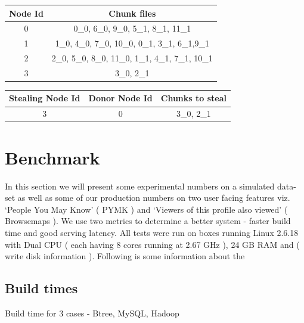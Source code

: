 \documentclass[10pt,twocolumn,preprint,natbib,authoryear]{sigplanconf}
\begin{document}
\begin{center}
    \begin{tabular}{ | c | c | }
    \hline
    Node Id & Chunk files \\ \hline
    0 &  	0\_0, 6\_0, 9\_0,      			5\_1, 8\_1, 11\_1 			\\
   	1 &   	1\_0, 4\_0, 7\_0, 10\_0,      	0\_1, 3\_1, 6\_1,9\_1  		\\
   	2 &    	2\_0, 5\_0, 8\_0, 11\_0,    	1\_1, 4\_1, 7\_1, 10\_1		\\
   	3 &   	3\_0,                         	2\_1 						\\
\hline
    \end{tabular}
\end{center}

\begin{center}
    \begin{tabular}{ | c | c | c | }
    \hline
    Stealing Node Id & Donor Node Id & Chunks to steal \\ \hline
    3 &  0 & 3\_0, 2\_1	\\
\hline
    \end{tabular}
\end{center}



\section{Benchmark}
\label{sec:benchmark}

In this section we will present some experimental numbers on a simulated data-set as well as some of our production numbers on two user facing features viz. `People You May Know' ( PYMK ) and `Viewers of this profile also viewed' ( Browsemaps ). We use two metrics to determine a better system - faster build time and good serving latency. All tests were run on boxes running Linux 2.6.18 with Dual CPU ( each having 8 cores running at 2.67 GHz ), 24 GB RAM and ( write disk information ). Following is some information about the 


\subsection{Build times}
\label{sec:benchmark:build_times}

Build time for 3 cases - Btree, MySQL, Hadoop
\end{document}
